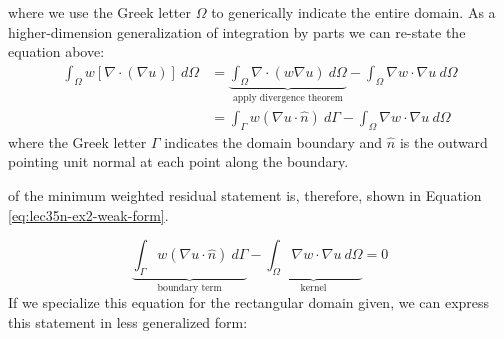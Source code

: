 where we use the Greek letter $\Omega$ to generically indicate the entire domain. As a higher-dimension generalization of integration by parts we can re-state the equation above:
\begin{align*}
\int_{\Omega} w \left[\nabla \cdot \left(\nabla u \right) \right] \ d\Omega &= \underbrace{\int_{\Omega} \nabla \cdot \left(w \nabla u\right) \ d\Omega}_{\text{apply divergence theorem}} - \int_{\Omega} \nabla w \cdot \nabla u \ d\Omega \\ 
&= \int_{\Gamma} w \left( \nabla u \cdot \hat{n} \right) \ d\Gamma - \int_{\Omega} \nabla w \cdot \nabla u \ d\Omega 
\end{align*}
where the Greek letter $\Gamma$ indicates the domain boundary and $\hat{n}$ is the outward pointing unit normal at each point along the boundary.

 of the minimum weighted residual statement is, therefore, shown in Equation \ref{eq:lec35n-ex2-weak-form}. 

\begin{equation}
\underbrace{\int_{\Gamma} w \left( \nabla u \cdot \hat{n} \right) \ d\Gamma}_{\text{boundary term}} - \underbrace{\int_{\Omega} \nabla w \cdot \nabla u \ d\Omega}_{\text{kernel}} = 0
\label{eq:lec35n-ex2-weak-form}
\end{equation}
If we specialize this equation for the rectangular domain given, we can express this statement in less generalized form:

